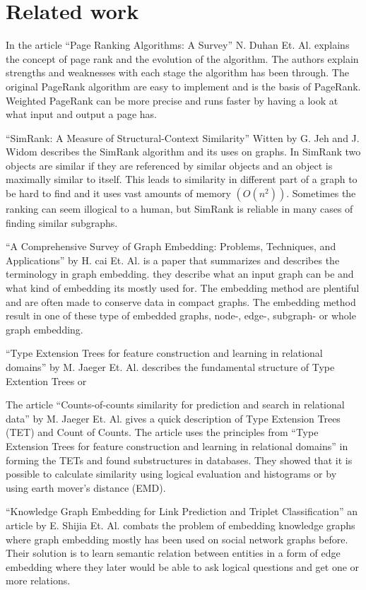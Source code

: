\section{Related work}
In the article “Page Ranking Algorithms: A Survey” N. Duhan Et. Al.\cite{4809246} explains the concept of page rank and the evolution of the algorithm. The authors explain strengths and weaknesses with each stage the algorithm has been through. The original PageRank algorithm are easy to implement and is the basis of PageRank. Weighted PageRank can be more precise and runs faster by having a look at what input and output a page has. 

“SimRank: A Measure of Structural-Context Similarity” Witten by G. Jeh and J. Widom\cite{10.1145/775047.775126} describes the SimRank algorithm and its uses on graphs. In SimRank two objects are similar if they are referenced by similar objects and an object is maximally similar to itself. This leads to similarity in different part of a graph to be hard to find and it uses vast amounts of memory $(O(n^2))$. Sometimes the ranking can seem illogical to a human, but SimRank is reliable in many cases of finding similar subgraphs.

“A Comprehensive Survey of Graph Embedding: Problems, Techniques, and Applications” by H. cai Et. Al.\cite{8294302} is a paper that summarizes and describes the terminology in graph embedding. they describe what an input graph can be and what kind of embedding its mostly used for. The embedding method are plentiful and are often made to conserve data in compact graphs. The embedding method result in one of these type of embedded graphs, node-, edge-, subgraph- or whole graph embedding.

“Type Extension Trees for feature construction and learning in relational domains” by M. Jaeger Et. Al. \cite{JAEGER201330} describes the fundamental structure of Type Extention Trees or  

The article “Counts-of-counts similarity for prediction and search in relational data” by M. Jaeger Et. Al.\cite{jaeger2019counts}  gives a quick description of Type Extension Trees (TET) and Count of Counts. The article uses the principles from “Type Extension Trees for feature construction and learning in relational domains” in forming the TETs and found substructures in databases. They showed that it is possible to calculate similarity using logical evaluation and histograms or by using earth mover’s distance (EMD).

“Knowledge Graph Embedding for Link Prediction and Triplet Classification” an article by E. Shijia Et. Al. \cite{10.1007/978-981-10-3168-7_23} combats the problem of embedding knowledge graphs where graph embedding mostly has been used on social network graphs before.  Their solution is to learn semantic relation between entities in a form of edge embedding where they later would be able to ask logical questions and get one or more relations.

